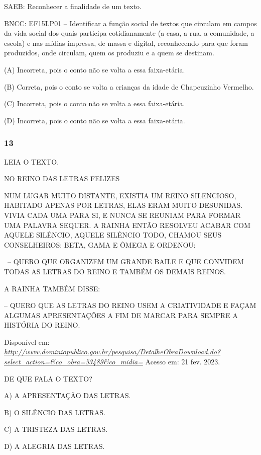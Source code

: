SAEB: Reconhecer a finalidade de um texto.

BNCC: EF15LP01 -- Identificar a função social de textos que
circulam em campos da vida social dos quais participa cotidianamente (a
casa, a rua, a comunidade, a escola) e nas mídias impressa, de massa e
digital, reconhecendo para que foram produzidos, onde circulam, quem os
produziu e a quem se destinam.

(A) Incorreta, pois o conto não se volta a essa faixa-etária.  

(B) Correta, pois o conto se volta a crianças da idade de Chapeuzinho Vermelho. 

(C) Incorreta, pois o conto não se volta a essa faixa-etária. 

(D) Incorreta, pois o conto não se volta a essa faixa-etária. 

\subsubsection{13}\label{section-85}

LEIA O TEXTO.

NO REINO DAS LETRAS FELIZES

NUM LUGAR MUITO DISTANTE, EXISTIA UM REINO SILENCIOSO, HABITADO APENAS
POR LETRAS, ELAS ERAM MUITO DESUNIDAS. VIVIA CADA UMA PARA SI, E NUNCA
SE REUNIAM PARA FORMAR UMA PALAVRA SEQUER. A RAINHA ENTÃO
RESOLVEU ACABAR COM AQUELE SILÊNCIO, AQUELE SILÊNCIO TODO, CHAMOU SEUS
CONSELHEIROS: BETA, GAMA E ÔMEGA E ORDENOU:

~-- QUERO QUE ORGANIZEM UM GRANDE BAILE E QUE CONVIDEM TODAS AS LETRAS
DO REINO E TAMBÉM OS DEMAIS REINOS.

A RAINHA TAMBÉM DISSE:

-- QUERO QUE AS LETRAS DO REINO USEM A CRIATIVIDADE E FAÇAM ALGUMAS
APRESENTAÇÕES A FIM DE MARCAR PARA SEMPRE A HISTÓRIA DO REINO.

Disponível em:
\href{http://www.dominiopublico.gov.br/pesquisa/DetalheObraDownload.do?select_action=\&co_obra=53489\&co_midia=}{\emph{http://www.dominiopublico.gov.br/pesquisa/DetalheObraDownload.do?select\_action=\&co\_obra=53489\&co\_midia=}}
Acesso em: 21 fev. 2023.

DE QUE FALA O TEXTO?

A) A APRESENTAÇÃO DAS LETRAS. 

B) O SILÊNCIO DAS LETRAS. 

C) A TRISTEZA DAS LETRAS. 

D) A ALEGRIA DAS LETRAS. 

